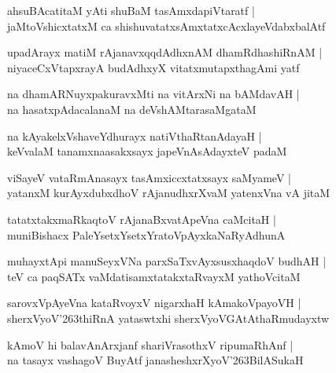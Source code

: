 \documentclass[twoside,12pt,openright]{book}
\def\S{\char'263}
\newcounter{shloka}[chapter]
\begin{document}
\begin{shloka}%
ahsuBAcatitaM yAti shuBaM tasAmxdapiVtaratf |\\
jaMtoVshicxtatxM ca shishuvatatxsAmxtatxcAcxlayeVdabxbalAtf
\end{shloka}

\begin{shloka}%
upadArayx matiM rAjanavxqqdAdhxnAM dhamRdhashiRnAM |\\
niyaceCxVtapxrayA budAdhxyX vitatxmutapxthagAmi yatf 
\end{shloka}

\begin{shloka}%
na dhamARNuyxpakuravxMti na vitArxNi na bAMdavAH |\\
na hasatxpAdacalanaM na deVshAMtarasaMgataM 
\end{shloka}

\begin{shloka}%
na kAyakelxVshaveYdhurayx natiVthaRtanAdayaH |\\
keVvalaM tanamxnaasakxsayx japeVnAsAdayxteV padaM
\end{shloka}

\begin{shloka}%
viSayeV vataRmAnasayx tasAmxiccxtatxsayx saMyameV |\\
yatanxM kurAyxdubxdhoV rAjanudhxrXvaM yatenxVna vA jitaM 
\end{shloka}

\begin{shloka}%
tatatxtakxmaRkaqtoV rAjanaBxvatApeVna caMcitaH |\\
muniBishacx PaleYsetxYsetxYratoVpAyxkaNaRyAdhunA 
\end{shloka}

\begin{shloka}%
muhayxtApi manuSeyxVNa parxSaTxvAyxsusxhaqdoV budhAH |\\
teV ca paqSATx vaMdatisamxtatakxtaRvayxM yathoVcitaM 
\end{shloka}

\begin{shloka}%
sarovxVpAyeVna kataRvoyxV nigarxhaH kAmakoVpayoVH |\\
sherxVyoV\S thiRnA yataswtxhi sherxVyoVGAtAthaRmudayxtw 
\end{shloka}

\begin{shloka}%
kAmoV hi balavAnArxjanf shariVrasothxV ripumaRhAnf |\\
na tasayx vashagoV BuyAtf janasheshxrXyoV\S BilASukaH 
\end{shloka}
\end{document}
